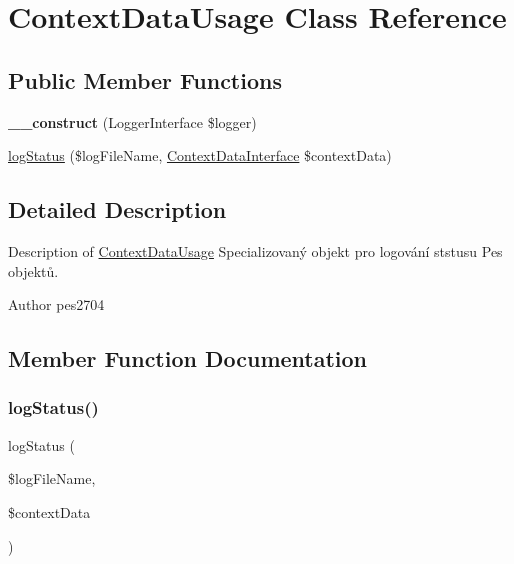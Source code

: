 \hypertarget{class_pes_1_1_type_1_1_context_data_usage}{}\section{Context\+Data\+Usage Class Reference}
\label{class_pes_1_1_type_1_1_context_data_usage}
\subsection*{Public Member Functions}
\begin{DoxyCompactItemize}
\item 
\mbox{\label{class_pes_1_1_type_1_1_context_data_usage_a2bd426f7ee55a596b1893454a77a006a}} 
{\bfseries \+\_\+\+\_\+construct} (Logger\+Interface \$logger)
\item 
\mbox{\hyperlink{class_pes_1_1_type_1_1_context_data_usage_a0138fcde21e73b921a31204101f5aec6}{log\+Status}} (\$log\+File\+Name, \mbox{\hyperlink{interface_pes_1_1_type_1_1_context_data_interface}{Context\+Data\+Interface}} \$context\+Data)
\end{DoxyCompactItemize}


\subsection{Detailed Description}
Description of \mbox{\hyperlink{class_pes_1_1_type_1_1_context_data_usage}{Context\+Data\+Usage}} Specializovaný objekt pro logování ststusu Pes objektů.

\begin{DoxyAuthor}{Author}
pes2704 
\end{DoxyAuthor}


\subsection{Member Function Documentation}
\mbox{\label{class_pes_1_1_type_1_1_context_data_usage_a0138fcde21e73b921a31204101f5aec6}} 
\subsubsection{\texorpdfstring{log\+Status()}{logStatus()}}
{\footnotesize\ttfamily log\+Status (\begin{DoxyParamCaption}\item[{}]{\$log\+File\+Name,  }\item[{\mbox{\hyperlink{interface_pes_1_1_type_1_1_context_data_interface}{Context\+Data\+Interface}}}]{\$context\+Data }\end{DoxyParamCaption})}

